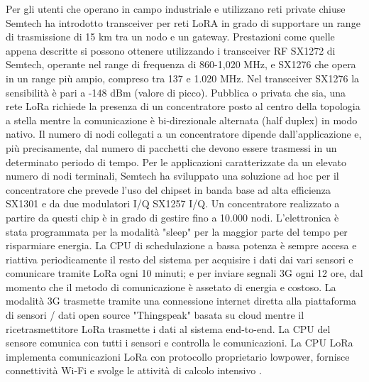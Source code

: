 \documentclass[a4paper]{report} %
\begin{document}
Per gli utenti che operano in campo industriale e utilizzano reti private chiuse Semtech ha introdotto transceiver per reti LoRA in grado di supportare un range di trasmissione di 15 km tra un nodo e un gateway. Prestazioni come quelle appena descritte si possono ottenere utilizzando i transceiver RF SX1272 di Semtech, operante nel range di frequenza di 860-1,020 MHz, e SX1276 che opera in un range più ampio, compreso tra 137 e 1.020 MHz. Nel transceiver SX1276 la sensibilità è pari a -148 dBm (valore di picco). Pubblica o privata che sia, una rete LoRa richiede la presenza di un concentratore posto al centro della topologia a stella mentre la comunicazione è bi-direzionale alternata (half duplex) in modo nativo. Il numero di nodi collegati a un concentratore dipende dall'applicazione e, più precisamente, dal numero di pacchetti che devono essere trasmessi in un determinato periodo di tempo. Per le applicazioni caratterizzate da un elevato numero di nodi terminali, Semtech ha sviluppato una soluzione ad hoc per il concentratore che prevede l'uso del chipset in banda base ad alta efficienza SX1301 e da due modulatori I/Q SX1257 I/Q. Un concentratore realizzato a partire da questi chip è in grado di gestire fino a 10.000 nodi. L'elettronica è stata programmata per la modalità "sleep" per la maggior parte del tempo per risparmiare energia. La CPU di schedulazione a bassa potenza è sempre accesa e riattiva periodicamente il resto del sistema per acquisire i dati dai vari sensori e comunicare tramite LoRa ogni 10 minuti; e per inviare segnali 3G ogni 12 ore, dal momento che il metodo di comunicazione è assetato di energia e costoso. La modalità 3G trasmette tramite una connessione internet diretta alla piattaforma di sensori / dati open source "Thingspeak" basata su cloud mentre il ricetrasmettitore LoRa trasmette i dati al sistema end-to-end. La CPU del sensore comunica con tutti i sensori e controlla le comunicazioni. La CPU LoRa implementa comunicazioni LoRa con protocollo proprietario lowpower, fornisce connettività Wi-Fi e svolge le attività di calcolo intensivo \cite{art:rif.43}. 
\end{document}
